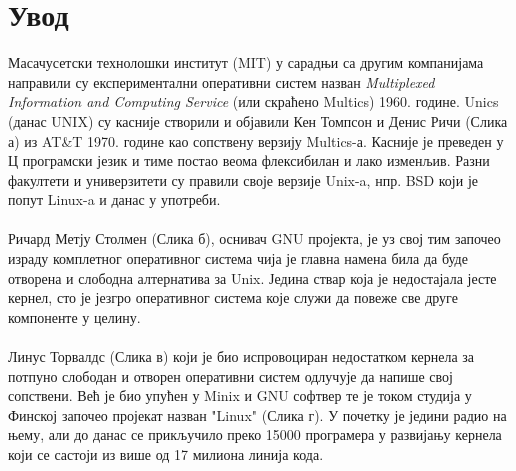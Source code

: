 \documentclass[a4paper,14pt]{article}
\begin{document}
\section*{Увод}
Масачусетски технолошки институт (MIT) у сарадњи са другим компанијама направили су експериментални оперативни систем назван \textit{Multiplexed Information and Computing Service} (или скраћено Multics) 1960. године. Unics (данас UNIX) су касније створили и објавили Кен Томпсон и Денис Ричи (Слика а) из AT\&T 1970. године као сопствену верзију Multics-а. Касније је преведен у Ц програмски језик и тиме постао веома флексибилан и лако изменљив. Разни факултети и универзитети су правили своје верзије Unix-a, нпр. BSD који је попут Linux-a и данас у употреби.\cite{revos}
\\\\
Ричард Метју Столмен (Слика б), оснивач GNU пројекта\cite{gnu}, је уз свој тим започео израду комплетног оперативног система чија је главна намена била да буде отворена и слободна алтернатива за Unix. Једина ствар која је недостајала јесте кернел, сто је језгро оперативног система које служи да повеже све друге компоненте у целину.
\\\\
Линус Торвалдс (Слика в) који је био испровоциран недостатком кернела за потпуно слободан и отворен оперативни систем одлучује да напише свој сопствени. Већ је био упућен у Minix и GNU софтвер те је током студија у Финској започео пројекат назван "Linux" (Слика г). У почетку је једини радио на њему, али до данас се прикључило преко 15000 програмера у развијању кернела који се састоји из више од 17 милиона линија кода\cite{linuxfoundation}.
\\\\
\end{document}
